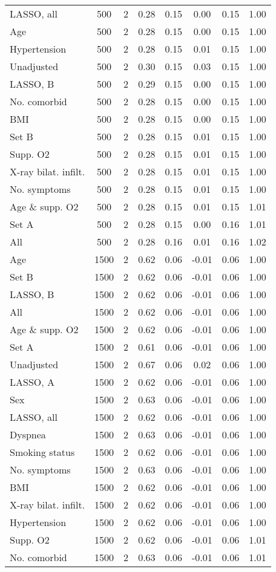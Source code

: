 \documentclass{article}
\begin{document}
\begin{table}[htpb]
{\begin{tabular}{lccccccc}
LASSO, all & 500 & 2 & 0.28 & 0.15 & 0.00 & 0.15 & 1.00\\
Age & 500 & 2 & 0.28 & 0.15 & 0.00 & 0.15 & 1.00\\
Hypertension & 500 & 2 & 0.28 & 0.15 & 0.01 & 0.15 & 1.00\\
Unadjusted & 500 & 2 & 0.30 & 0.15 & 0.03 & 0.15 & 1.00\\
LASSO, B & 500 & 2 & 0.29 & 0.15 & 0.00 & 0.15 & 1.00\\
No. comorbid & 500 & 2 & 0.28 & 0.15 & 0.00 & 0.15 & 1.00\\
BMI & 500 & 2 & 0.28 & 0.15 & 0.00 & 0.15 & 1.00\\
Set B & 500 & 2 & 0.28 & 0.15 & 0.01 & 0.15 & 1.00\\
Supp. O2 & 500 & 2 & 0.28 & 0.15 & 0.01 & 0.15 & 1.00\\
X-ray bilat. infilt. & 500 & 2 & 0.28 & 0.15 & 0.01 & 0.15 & 1.00\\
No. symptoms & 500 & 2 & 0.28 & 0.15 & 0.01 & 0.15 & 1.00\\
Age \& supp. O2 & 500 & 2 & 0.28 & 0.15 & 0.01 & 0.15 & 1.01\\
Set A & 500 & 2 & 0.28 & 0.15 & 0.00 & 0.16 & 1.01\\
All & 500 & 2 & 0.28 & 0.16 & 0.01 & 0.16 & 1.02\\ \midrule
Age & 1500 & 2 & 0.62 & 0.06 & -0.01 & 0.06 & 1.00\\
Set B & 1500 & 2 & 0.62 & 0.06 & -0.01 & 0.06 & 1.00\\
LASSO, B & 1500 & 2 & 0.62 & 0.06 & -0.01 & 0.06 & 1.00\\
All & 1500 & 2 & 0.62 & 0.06 & -0.01 & 0.06 & 1.00\\
Age \& supp. O2 & 1500 & 2 & 0.62 & 0.06 & -0.01 & 0.06 & 1.00\\
Set A & 1500 & 2 & 0.61 & 0.06 & -0.01 & 0.06 & 1.00\\
Unadjusted & 1500 & 2 & 0.67 & 0.06 & 0.02 & 0.06 & 1.00\\
LASSO, A & 1500 & 2 & 0.62 & 0.06 & -0.01 & 0.06 & 1.00\\
Sex & 1500 & 2 & 0.63 & 0.06 & -0.01 & 0.06 & 1.00\\
LASSO, all & 1500 & 2 & 0.62 & 0.06 & -0.01 & 0.06 & 1.00\\
Dyspnea & 1500 & 2 & 0.63 & 0.06 & -0.01 & 0.06 & 1.00\\
Smoking status & 1500 & 2 & 0.62 & 0.06 & -0.01 & 0.06 & 1.00\\
No. symptoms & 1500 & 2 & 0.63 & 0.06 & -0.01 & 0.06 & 1.00\\
BMI & 1500 & 2 & 0.62 & 0.06 & -0.01 & 0.06 & 1.00\\
X-ray bilat. infilt. & 1500 & 2 & 0.62 & 0.06 & -0.01 & 0.06 & 1.00\\
Hypertension & 1500 & 2 & 0.62 & 0.06 & -0.01 & 0.06 & 1.00\\
Supp. O2 & 1500 & 2 & 0.62 & 0.06 & -0.01 & 0.06 & 1.01\\
No. comorbid & 1500 & 2 & 0.63 & 0.06 & -0.01 & 0.06 & 1.01\\
\bottomrule
\hline
\end{tabular}}
\end{table}
\end{document}
